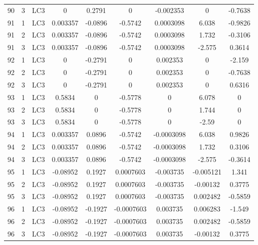 \documentclass{article}%
\begin{document}
\begin{longtable}{| c c c | c c c c c c |}
90&3&LC3&0&0.2791&0&{-}0.002353&0&{-}0.7638\\%
91&1&LC3&0.003357&{-}0.0896&{-}0.5742&0.0003098&6.038&{-}0.9826\\%
91&2&LC3&0.003357&{-}0.0896&{-}0.5742&0.0003098&1.732&{-}0.3106\\%
91&3&LC3&0.003357&{-}0.0896&{-}0.5742&0.0003098&{-}2.575&0.3614\\%
92&1&LC3&0&{-}0.2791&0&0.002353&0&{-}2.159\\%
92&2&LC3&0&{-}0.2791&0&0.002353&0&{-}0.7638\\%
92&3&LC3&0&{-}0.2791&0&0.002353&0&0.6316\\%
93&1&LC3&0.5834&0&{-}0.5778&0&6.078&0\\%
93&2&LC3&0.5834&0&{-}0.5778&0&1.744&0\\%
93&3&LC3&0.5834&0&{-}0.5778&0&{-}2.59&0\\%
94&1&LC3&0.003357&0.0896&{-}0.5742&{-}0.0003098&6.038&0.9826\\%
94&2&LC3&0.003357&0.0896&{-}0.5742&{-}0.0003098&1.732&0.3106\\%
94&3&LC3&0.003357&0.0896&{-}0.5742&{-}0.0003098&{-}2.575&{-}0.3614\\%
95&1&LC3&{-}0.08952&0.1927&0.0007603&{-}0.003735&{-}0.005121&1.341\\%
95&2&LC3&{-}0.08952&0.1927&0.0007603&{-}0.003735&{-}0.00132&0.3775\\%
95&3&LC3&{-}0.08952&0.1927&0.0007603&{-}0.003735&0.002482&{-}0.5859\\%
96&1&LC3&{-}0.08952&{-}0.1927&{-}0.0007603&0.003735&0.006283&{-}1.549\\%
96&2&LC3&{-}0.08952&{-}0.1927&{-}0.0007603&0.003735&0.002482&{-}0.5859\\%
96&3&LC3&{-}0.08952&{-}0.1927&{-}0.0007603&0.003735&{-}0.00132&0.3775\\%
\end{longtable}%
\newpage

%
\end{document}
